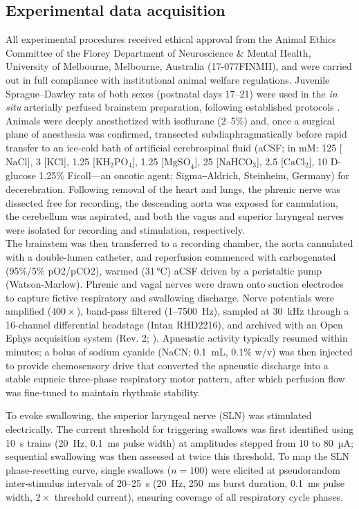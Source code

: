 \documentclass[pdflatex,sn-mathphys-ay]{sn-jnl}%
\theoremstyle{thmstyleone}%
\theoremstyle{thmstyletwo}%
\theoremstyle{thmstylethree}%
\begin{document}
\subsection{Experimental data acquisition}
All experimental procedures received ethical approval from the Animal Ethics Committee of the Florey Department of Neuroscience \& Mental Health, University of Melbourne, Melbourne, Australia (17-077FINMH), and were carried out in full compliance with institutional animal welfare regulations.
Juvenile Sprague–Dawley rats of both sexes (postnatal days 17–21) were used in the \textit{in situ} arterially perfused brainstem preparation, following established protocols \citep{paton1996working, dutschmann2000respiratory}. Animals were deeply anesthetized with isoflurane (2–5\%) and, once a surgical plane of anesthesia was confirmed, transected subdiaphragmatically before rapid transfer to an ice-cold bath of artificial cerebrospinal fluid (aCSF; in mM: 125 [$\text{NaCl}$], 3 [KCl], 1.25 [$\text{KH}_2\text{PO}_4$], 1.25 [$\text{MgSO}_4$], 25 [$\text{NaH}\text{CO}_3$], 2.5 [$\text{CaCl}_2$], 10  D-glucose 1.25\% Ficoll---an oncotic agent; Sigma‒Aldrich, Steinheim, Germany) for decerebration. Following removal of the heart and lungs, the phrenic nerve was dissected free for recording, the descending aorta was exposed for cannulation, the cerebellum was aspirated, and both the vagus and superior laryngeal nerves were isolated for recording and stimulation, respectively. \\
The brainstem was then transferred to a recording chamber, the aorta cannulated with a double-lumen catheter, and reperfusion commenced with carbogenated (95\%/5\% pO2/pCO2), warmed (31\,°C) aCSF driven by a peristaltic pump (Watson-Marlow). Phrenic and vagal nerves were drawn onto suction electrodes to capture fictive respiratory and swallowing discharge. Nerve potentials were amplified ($400\times$), band-pass filtered (1–7500~Hz), sampled at 30~kHz through a 16-channel differential headstage (Intan RHD2216), and archived with an Open Ephys acquisition system (Rev. 2; \citet{siegle2017open}). Apneustic activity typically resumed within minutes; a bolus of sodium cyanide (NaCN; 0.1~mL, 0.1\% w/v) was then injected to provide chemosensory drive that converted the apneustic discharge into a stable eupneic three-phase respiratory motor pattern, after which perfusion flow was fine-tuned to maintain rhythmic stability.

To evoke swallowing, the superior laryngeal nerve (SLN) was stimulated electrically. The current threshold for triggering swallows was first identified using 10~s trains (20~Hz, 0.1~ms pulse width) at amplitudes stepped from 10 to 80~µA; sequential swallowing was then assessed at twice this threshold.
To map the SLN phase-resetting curve, single swallows ($n = 100$) were elicited at pseudorandom inter-stimulus intervals of 20–25~s (20~Hz, 250~ms burst duration, 0.1~ms pulse width, $2\times$ threshold current), ensuring coverage of all respiratory cycle phases.
\end{document}
